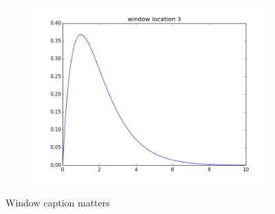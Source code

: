 \begin{figure}
\begin{subfigure}{.4\textwidth}
\end{subfigure}
\begin{subfigure}{.6\textwidth}
\centering
\includegraphics[width=\textwidth]{window_location_3.png}
\end{subfigure}
\caption{Window caption matters}
\label{fig:windowcaption}
\end{figure}

\printbibliography